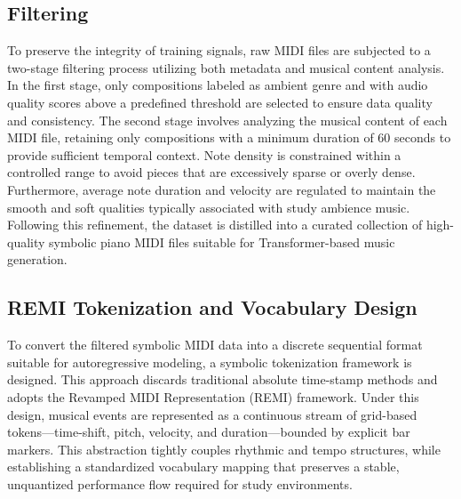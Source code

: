 \documentclass[conference,a4paper]{IEEEtran}
\begin{document}
\subsection{Filtering}
To preserve the integrity of training signals, raw MIDI files are subjected to a two-stage filtering process utilizing both metadata and musical content analysis. In the first stage, only compositions labeled as ambient genre and with audio quality scores above a predefined threshold are selected to ensure data quality and consistency. The second stage involves analyzing the musical content of each MIDI file, retaining only compositions with a minimum duration of 60 seconds to provide sufficient temporal context. Note density is constrained within a controlled range to avoid pieces that are excessively sparse or overly dense. Furthermore, average note duration and velocity are regulated to maintain the smooth and soft qualities typically associated with study ambience music. Following this refinement, the dataset is distilled into a curated collection of high-quality symbolic piano MIDI files suitable for Transformer-based music generation.

\subsection{REMI Tokenization and Vocabulary Design}
To convert the filtered symbolic MIDI data into a discrete sequential format suitable for autoregressive modeling, a symbolic tokenization framework is designed. This approach discards traditional absolute time-stamp methods and adopts the Revamped MIDI Representation (REMI) framework. Under this design, musical events are represented as a continuous stream of grid-based tokens—time-shift, pitch, velocity, and duration—bounded by explicit bar markers. This abstraction tightly couples rhythmic and tempo structures, while establishing a standardized vocabulary mapping that preserves a stable, unquantized performance flow required for study environments.
\end{document}

